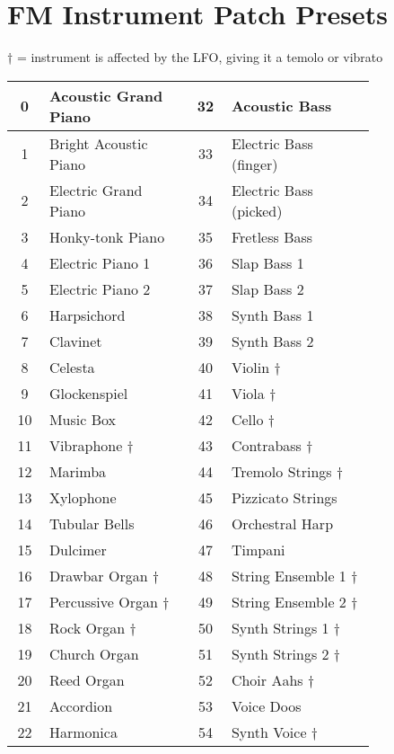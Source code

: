 \chapter{FM Instrument Patch Presets}

† = instrument is affected by the LFO, giving it a temolo or vibrato

\begin{tabular}{|c|p{0.4\linewidth}|c|p{0.4\linewidth}|}
	\hline
	0  &  Acoustic Grand Piano  & 32  &  Acoustic Bass  \\ \hline
	1  &  Bright Acoustic Piano  & 33  &  Electric Bass (finger)  \\ \hline
	2  &  Electric Grand Piano  & 34  &  Electric Bass (picked)  \\ \hline
	3  &  Honky-tonk Piano  & 35  &  Fretless Bass  \\ \hline
	4  &  Electric Piano 1  & 36  &  Slap Bass 1  \\ \hline
	5  &  Electric Piano 2  & 37  &  Slap Bass 2  \\ \hline
	6  &  Harpsichord  & 38  &  Synth Bass 1  \\ \hline
	7  &  Clavinet  & 39  &  Synth Bass 2  \\ \hline
	8  &  Celesta  & 40  &  Violin † \\ \hline
	9  &  Glockenspiel  & 41  &  Viola † \\ \hline
	10  &  Music Box  & 42  &  Cello † \\ \hline
	11  &  Vibraphone †  & 43  &  Contrabass † \\ \hline
	12  &  Marimba  & 44  &  Tremolo Strings † \\ \hline
	13  &  Xylophone  & 45  &  Pizzicato Strings  \\ \hline
	14  &  Tubular Bells  & 46  &  Orchestral Harp  \\ \hline
	15  &  Dulcimer  & 47  &  Timpani  \\ \hline
	16  &  Drawbar Organ † & 48  &  String Ensemble 1 † \\ \hline
	17  &  Percussive Organ † & 49  &  String Ensemble 2 † \\ \hline
	18  &  Rock Organ † & 50  &  Synth Strings 1 † \\ \hline
	19  &  Church Organ  & 51  &  Synth Strings 2 † \\ \hline
	20  &  Reed Organ  & 52  &  Choir Aahs † \\ \hline
	21  &  Accordion  & 53  &  Voice Doos  \\ \hline
	22  &  Harmonica  & 54  &  Synth Voice † \\ \hline

\end{tabular}
